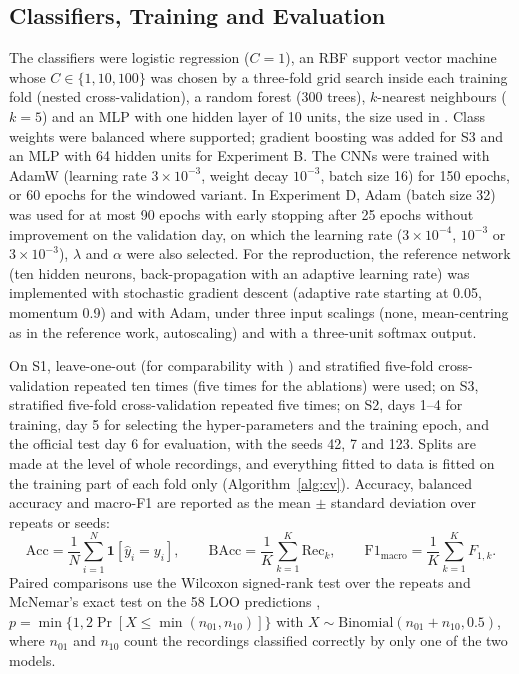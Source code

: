 \subsection{Classifiers, Training and Evaluation}

The classifiers were logistic regression ($C = 1$), an RBF support vector machine whose $C \in \{1, 10, 100\}$ was chosen by a three-fold grid search inside each training fold (nested cross-validation), a random forest (300 trees), $k$-nearest neighbours ($k = 5$) and an MLP with one hidden layer of 10 units, the size used in \cite{rodriguez2010electronic}. Class weights were balanced where supported; gradient boosting was added for S3 and an MLP with 64 hidden units for Experiment B. The CNNs were trained with AdamW (learning rate $3 \times 10^{-3}$, weight decay $10^{-3}$, batch size 16) for 150 epochs, or 60 epochs for the windowed variant. In Experiment D, Adam (batch size 32) was used for at most 90 epochs with early stopping after 25 epochs without improvement on the validation day, on which the learning rate ($3 \times 10^{-4}$, $10^{-3}$ or $3 \times 10^{-3}$), $\lambda$ and $\alpha$ were also selected. For the reproduction, the reference network (ten hidden neurons, back-propagation with an adaptive learning rate) was implemented with stochastic gradient descent (adaptive rate starting at 0.05, momentum 0.9) and with Adam, under three input scalings (none, mean-centring as in the reference work, autoscaling) and with a three-unit softmax output.

On S1, leave-one-out (for comparability with \cite{rodriguez2010electronic}) and stratified five-fold cross-validation repeated ten times (five times for the ablations) were used; on S3, stratified five-fold cross-validation repeated five times; on S2, days 1--4 for training, day 5 for selecting the hyper-parameters and the training epoch, and the official test day 6 for evaluation, with the seeds 42, 7 and 123. Splits are made at the level of whole recordings, and everything fitted to data is fitted on the training part of each fold only (Algorithm~\ref{alg:cv}). Accuracy, balanced accuracy and macro-F1 are reported as the mean $\pm$ standard deviation over repeats or seeds:
\begin{equation}
\mathrm{Acc} = \frac{1}{N}\sum_{i=1}^{N} \mathbf{1}[\hat{y}_i = y_i], \qquad \mathrm{BAcc} = \frac{1}{K}\sum_{k=1}^{K} \mathrm{Rec}_k, \qquad \mathrm{F1}_{\mathrm{macro}} = \frac{1}{K}\sum_{k=1}^{K} F_{1,k}.
\end{equation}
Paired comparisons use the Wilcoxon signed-rank test over the repeats \cite{demsar2006statistical} and McNemar's exact test on the 58 LOO predictions \cite{dietterich1998approximate}, $p = \min\{1, 2\Pr[X \leq \min(n_{01}, n_{10})]\}$ with $X \sim \mathrm{Binomial}(n_{01} + n_{10}, 0.5)$, where $n_{01}$ and $n_{10}$ count the recordings classified correctly by only one of the two models.

